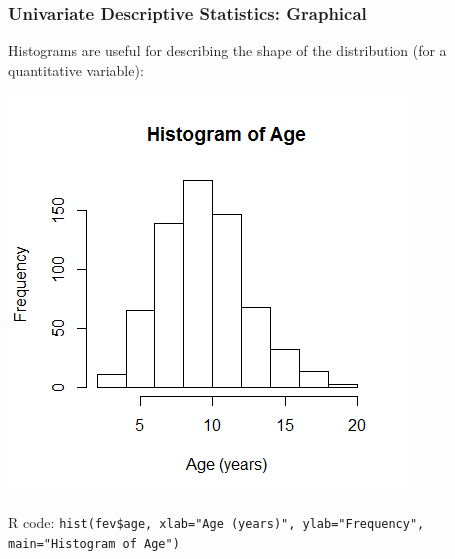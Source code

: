 \documentclass[12pt, 
hyperref={colorlinks=true, linkcolor=blue, urlcolor=cyan}]{beamer}
\begin{document}
\begin{frame}
\frametitle{Univariate Descriptive Statistics: Graphical}

Histograms are useful for describing the shape of the distribution (for a quantitative variable):\vspace{-0.7cm}

\center \includegraphics[height=0.6\textheight]{./histogram-age}

\pause
\vspace{-0.45cm} \begin{scriptsize} R code:  \texttt{hist(fev\$age, xlab="Age (years)", ylab="Frequency", main="Histogram of Age")\\} \end{scriptsize}

\end{frame}
\end{document}
